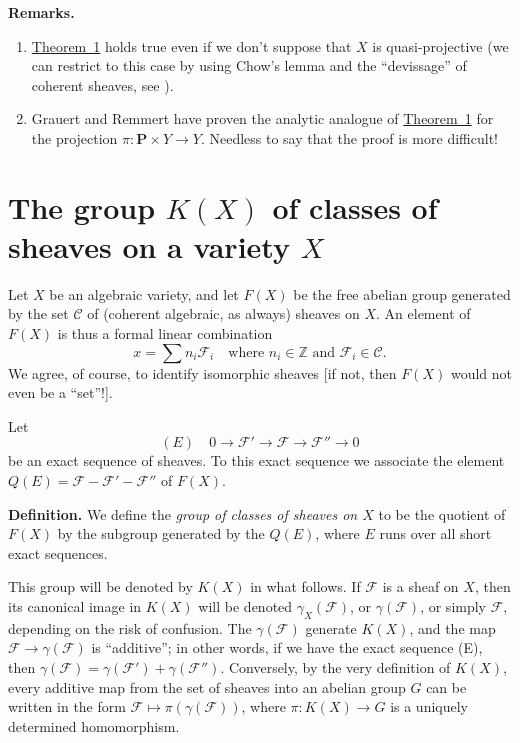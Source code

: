 \documentclass{article}
\newenvironment{rmenv}[1]
  {\phantomsection\par\medskip\noindent\textbf{#1.}\rmfamily}
  {\par\medskip}
\newcommand{\scr}[1]{{\mathscr{#1}}}
\renewcommand{\cal}[1]{{\mathcal{#1}}}
\newcommand{\PP}{\mathbf{P}}
\newcommand{\oldpage}[1]{\marginpar{\footnotesize$\Big\vert$ \textit{p.~#1}}}
\begin{document}
\begin{rmenv}{Remarks}
  \phantom{.}
  \begin{enumerate}
    \item \hyperref[theorem1]{Theorem~1} holds true even if we don't suppose that $X$ is quasi-projective (we can restrict to this case by using Chow's lemma and the ``devissage'' of coherent sheaves, see \cite{6}).
    \item Grauert and Remmert have proven the analytic analogue of \hyperref[theorem1]{Theorem~1} for the projection $\pi\colon\PP\times Y\to Y$.
      Needless to say that the proof is more difficult!
  \end{enumerate}
\end{rmenv}


\section{The group \texorpdfstring{$K(X)$}{K(X)} of classes of sheaves on a variety \texorpdfstring{$X$}{X}}
\label{section4}

\oldpage{105}
Let $X$ be an algebraic variety, and let $F(X)$ be the free abelian group generated by the set $\cal{C}$ of (coherent algebraic, as always) sheaves on $X$.
An element of $F(X)$ is thus a formal linear combination
\[
  x = \sum n_i\scr{F}_i
  \quad
  \mbox{where $n_i\in\mathbb{Z}$ and $\scr{F}_i\in\cal{C}$.}
\]
We agree, of course, to identify isomorphic sheaves [if not, then $F(X)$ would not even be a ``set''!].

Let
\[
  (E)\quad
  0\to\scr{F}'\to\scr{F}\to\scr{F''}\to0
\]
be an exact sequence of sheaves.
To this exact sequence we associate the element $Q(E)=\scr{F}-\scr{F}'-\scr{F}''$ of $F(X)$.

\begin{rmenv}{Definition}
  We define the \emph{group of classes of sheaves on $X$} to be the quotient of $F(X)$ by the subgroup generated by the $Q(E)$, where $E$ runs over all short exact sequences.
\end{rmenv}

This group will be denoted by $K(X)$ in what follows.
If $\scr{F}$ is a sheaf on $X$, then its canonical image in $K(X)$ will be denoted $\gamma_X(\scr{F})$, or $\gamma(\scr{F})$, or simply $\scr{F}$, depending on the risk of confusion.
The $\gamma(\scr{F})$ generate $K(X)$, and the map $\scr{F}\to\gamma(\scr{F})$ is ``additive'';
in other words, if we have the exact sequence (E), then $\gamma(\scr{F})=\gamma(\scr{F}')+\gamma(\scr{F}'')$.
Conversely, by the very definition of $K(X)$, every additive map from the set of sheaves into an abelian group $G$ can be written in the form $\scr{F}\mapsto\pi(\gamma(\scr{F}))$, where $\pi\colon K(X)\to G$ is a uniquely determined homomorphism.
\end{document}

